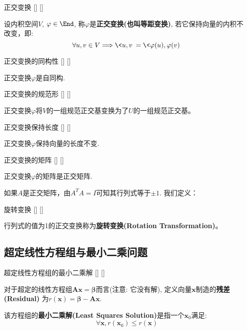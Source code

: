 \documentclass[UTF8]{ctexart}
\begin{document}
		\begin{dfn}
			[]
			{正交变换}
			[]
			[]

			设内积空间$V$, $\varphi\in\End$, 称$\varphi$是\textbf{正交变换(也叫等距变换)}, 若它保持向量的内积不改变，即: 
			\[\forall u,v\in V\Longrightarrow\<u,v\>=\<\varphi(u),\varphi(v)\>\]
		\end{dfn}
		
		\begin{ppt}
			[]
			{正交变换的同构性}
			[]
			[]

			正交变换$\varphi$是自同构. 
		\end{ppt}
		
		\begin{ppt}
			[]
			{正交变换的规范形}
			[]
			[]

			正交变换$\varphi$将$V$的一组规范正交基变换为了$U$的一组规范正交基。
		\end{ppt}

		\begin{ppt}
			[]
			{正交变换保持长度}
			[]
			[]

			正交变换$\varphi$保持向量的长度不变. 
		\end{ppt}

		\begin{ppt}
			[]
			{正交变换的矩阵}
			[]
			[]

			正交变换$\varphi$的矩阵是正交矩阵.
		\end{ppt}

		如果$A$是正交矩阵，由\(A^TA=I\)可知其行列式等于$\pm 1$. 我们定义：

		\begin{dfn}
			[]
			{旋转变换}
			[]
			[]

			行列式的值为1的正交变换称为\textbf{旋转变换(Rotation Transformation)}。
		\end{dfn}

	
	\subsection{超定线性方程组与最小二乘问题}
	
		\begin{dfn}
			[]
			{超定线性方程组的最小二乘解}
			[]
			[]

			对于超定的线性方程组$\bm{A}\bm{x}=\bm{\beta}$而言(注意: 它没有解), 定义向量$\bm{x}$制造的\textbf{残差(Residual)} 为$r(\bm{x})=\bm{\beta}-\bm{A}\bm{x}$. 
			
			该方程组的\textbf{最小二乘解(Least Squares Solution)}是指一个$\bm{x}_0$满足: 
			\[\forall \bm{x}, r(\bm{x}_0)\leq r(\bm{x})\]
		\end{dfn}
	
\end{document}
